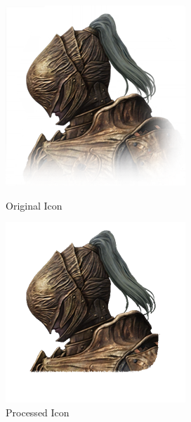 \begin{figure}[htbp]
    \centering
    \begin{minipage}{0.35\textwidth}
        \centering
        \includegraphics[width=\textwidth]{ressources/icon_4_original.png}
        \caption{Original Icon}
        \label{fig:original_icon}
    \end{minipage}
    \hfill
    \begin{minipage}{0.35\textwidth}
        \centering
        \includegraphics[width=\textwidth]{ressources/icon_4.png}
        \caption{Processed Icon}
        \label{fig:processed_icon}
    \end{minipage}
\end{figure}

